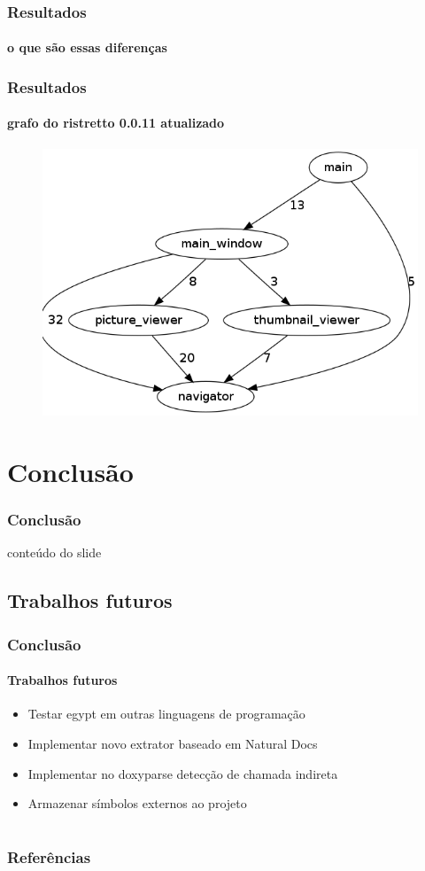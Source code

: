 \documentclass{beamer}
\begin{document}
\begin{frame}
\frametitle{Resultados}
\framesubtitle{o que são essas diferenças}
\end{frame}

\begin{frame}
\frametitle{Resultados}
\framesubtitle{grafo do ristretto 0.0.11 atualizado}
 \begin{figure}
 \center
 \includegraphics[scale=0.3]{imagens/ristretto-0_0_11-doxyparse-2}
 \label{fig:ristretto-0.0.11-doxyparse-2}
 \end{figure}
\end{frame}

\section{Conclusão}

\begin{frame}
\frametitle{Conclusão}
 conteúdo do slide
\end{frame}

\subsection{Trabalhos futuros}

\begin{frame}
\frametitle{Conclusão}
\framesubtitle{Trabalhos futuros}
 \begin{itemize}
 \item<1- >Testar egypt em outras linguagens de programação
 \item<1- >Implementar novo extrator baseado em Natural Docs
 \item<1- >Implementar no doxyparse detecção de chamada indireta
 \item<1- >Armazenar símbolos externos ao projeto
 \end{itemize}
\end{frame}

\section{}

\begin{frame}
\frametitle{Referências}

{}
\end{frame}
\end{document}
